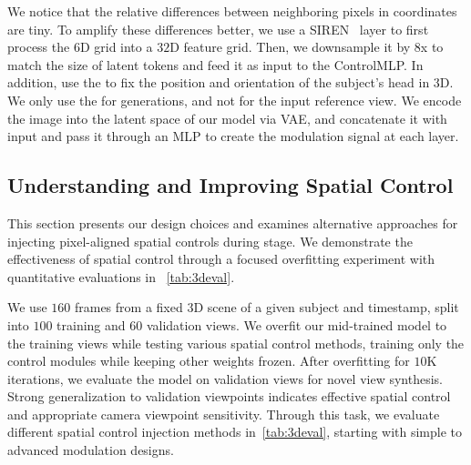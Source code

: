 \vspace{1mm}
 We notice that the relative differences between neighboring pixels in \plucker coordinates are tiny. To amplify these differences better, we use a SIREN~\cite{SIREN} layer to first process the $6$D grid into a $32$D feature grid. Then, we downsample it by $8$x to match the size of latent tokens and feed it as input to the ControlMLP. In addition, use the \spatialanchor to fix the position and orientation of the subject's head in 3D. We only use the \spatialanchor for generations, and not for the input reference view. We encode the \spatialanchor image into the latent space of our model via VAE, and concatenate it with \plucker input and pass it through an MLP to create the modulation signal at each layer. 


\subsection{Understanding and Improving Spatial Control}\label{ssec:spatial_control}

\noindent This section presents our design choices and examines alternative approaches for injecting pixel-aligned spatial controls during \posttraining stage. We demonstrate the effectiveness of spatial control through a focused overfitting experiment with quantitative evaluations in ~\cref{tab:3deval}.

\vspace{1mm}
 We use $160$ frames from a fixed 3D scene of a given subject and timestamp, split into $100$ training and $60$ validation views. We overfit our mid-trained model to the training views while testing various spatial control methods, training only the control modules while keeping other weights frozen. After overfitting for $10$K iterations, we evaluate the model on validation views for novel view synthesis.  Strong generalization to validation viewpoints indicates effective spatial control and appropriate camera viewpoint sensitivity. Through this task, we evaluate different spatial control injection methods in~\cref{tab:3deval}, starting with simple to advanced modulation designs.



